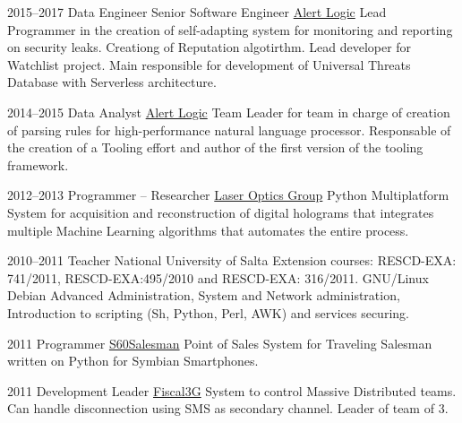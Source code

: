 \documentclass[11pt,a4paper]{moderncv}
\begin{document}
    \cventry
        {2015--2017}
        {Data Engineer}                                                          %
        {Senior Software Engineer}                                               %
        {\href{https://alertlogic.com}{Alert Logic}} {} {}
        {
            Lead Programmer in the creation of self-adapting system for
                monitoring and reporting on security leaks.
            Creationg of Reputation algotirthm. Lead developer for
                Watchlist project.
            Main responsible for development of Universal Threats
                Database with Serverless architecture.
        }

    \cventry
        {2014--2015}
        {Data Analyst}
        {\href{https://alertlogic.com}{Alert Logic}} {} {}
        {
            Team Leader for team in charge of creation of parsing rules
                for high-performance natural language processor.
            Responsable of the creation of a Tooling effort and author 
                of the first version of the tooling framework.
        }

    \cventry
        {2012--2013}
        {Programmer -- Researcher}
        {\href{http://github.com/pointtonull/golsoft}{Laser Optics Group}} {} {}
        {
            Python Multiplatform System for acquisition and reconstruction of
                digital holograms that integrates multiple Machine Learning
                algorithms that automates the entire process.
        }

    \cventry
        {2010--2011}
        {Teacher}
        {National University of Salta} {} {}
        {
            Extension courses: RESCD-EXA: 741/2011,  RESCD-EXA:495/2010 and
                RESCD-EXA: 316/2011. GNU/Linux Debian Advanced Administration,
                System and Network administration, Introduction to scripting
                (Sh, Python, Perl, AWK) and services securing.
        }

    \cventry
        {2011}
        {Programmer}
        {\href{http://github.com/pointtonull/S60Salesman}{S60Salesman}} {} {}
        {
            Point of Sales System for Traveling Salesman written on Python for
                Symbian Smartphones.
        }

    \cventry
        {2011}
        {Development Leader}
        {\href{http://github.com/pointtonull/Fiscal3G}{Fiscal3G}} {} {}
        {
            System to control Massive Distributed teams. Can handle
                disconnection using SMS as secondary channel. Leader of team of
                3.
        }
\end{document}
